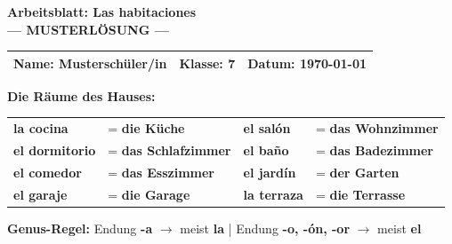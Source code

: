 \documentclass[11pt, a4paper]{article}
\newcommand{\fachfarbe}{spanisch}
\newcommand{\thema}{Las habitaciones}
\newcommand{\klasse}{7}
\newcommand{\datum}{\today}
\newcommand{\loesung}[1]{\textcolor{loesung}{\textbf{#1}}}
\newcommand{\es}[1]{\textcolor{\fachfarbe}{\textbf{#1}}}
\begin{document}

\begin{center}
    {\Large\bfseries\textcolor{\fachfarbe}{Arbeitsblatt: \thema}}\\[0.3em]
    {\large\textcolor{loesung}{\textbf{--- MUSTERLÖSUNG ---}}}
\end{center}

\vspace{5pt}

\noindent
\begin{tabularx}{\textwidth}{|X|X|X|}
\hline
\textbf{Name:} \textcolor{loesung}{Musterschüler/in} &
\textbf{Klasse:} \klasse &
\textbf{Datum:} \datum \\
\hline
\end{tabularx}

\vspace{15pt}


\begin{merkkasten}
\textbf{Die Räume des Hauses:}

\vspace{0.5em}

\begin{tabular}{llll}
\es{la cocina} & = \loesung{die Küche} & \es{el salón} & = \loesung{das Wohnzimmer} \\[0.8em]
\es{el dormitorio} & = \loesung{das Schlafzimmer} & \es{el baño} & = \loesung{das Badezimmer} \\[0.8em]
\es{el comedor} & = \loesung{das Esszimmer} & \es{el jardín} & = \loesung{der Garten} \\[0.8em]
\es{el garaje} & = \loesung{die Garage} & \es{la terraza} & = \loesung{die Terrasse} \\
\end{tabular}

\vspace{0.8em}

\textbf{Genus-Regel:} Endung \textbf{-a} $\rightarrow$ meist \es{la} | Endung \textbf{-o, -ón, -or} $\rightarrow$ meist \es{el}

\end{merkkasten}

\vspace{10pt}
\end{document}
